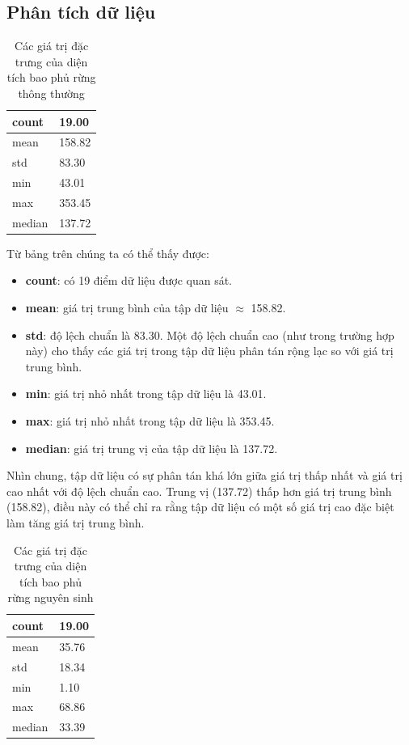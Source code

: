 \documentclass[a4paper,12pt]{report}
\begin{document}
\subsection{Phân tích dữ liệu} %
\label{sub:phân_tích_dữ_liệu}
\begin{flushleft}
	\begin{table}[H]
		\centering
		\begin{tabular}{|l|l|}
			\hline
			count & 19.00  \\
			\hline
			mean & 158.82  \\
			\hline
			std & 83.30  \\
			\hline
			min & 43.01  \\
			\hline
			max & 353.45  \\
			\hline
			median & 137.72  \\
			\hline
		\end{tabular}
		\caption{Các giá trị đặc trưng của diện tích bao phủ rừng thông thường}
	\end{table}

	Từ bảng trên chúng ta có thể thấy được:
	\begin{itemize}
		\item \textbf{count}: có 19 điểm dữ liệu được quan sát.

		\item \textbf{mean}: giá trị trung bình của tập dữ liệu $\approx$ 158.82.

		\item \textbf{std}: độ lệch chuẩn là 83.30. Một độ lệch chuẩn cao (như trong trường hợp này) cho thấy các giá trị trong tập dữ liệu phân tán rộng lạc so với giá trị trung bình.

		\item \textbf{min}: giá trị nhỏ nhất trong tập dữ liệu là 43.01.

		\item \textbf{max}: giá trị nhỏ nhất trong tập dữ liệu là 353.45.

		\item \textbf{median}: giá trị trung vị của tập dữ liệu là 137.72.
	\end{itemize}

	Nhìn chung, tập dữ liệu có sự phân tán khá lớn giữa giá trị thấp nhất và giá trị cao nhất với độ lệch chuẩn cao. Trung vị (137.72) thấp hơn giá trị trung bình (158.82), điều này có thể chỉ ra rằng tập dữ liệu có một số giá trị cao đặc biệt làm tăng giá trị trung bình.

	\begin{table}[H]
		\centering
		\begin{tabular}{|l|l|}
			\hline
			count & 19.00 \\
			\hline
			mean & 35.76 \\
			\hline
			std & 18.34 \\
			\hline
			min & 1.10 \\
			\hline
			max & 68.86 \\
			\hline
			median & 33.39 \\
			\hline
		\end{tabular}
		\caption{Các giá trị đặc trưng của diện tích bao phủ rừng nguyên sinh}
	\end{table}


\end{flushleft}
\end{document}
